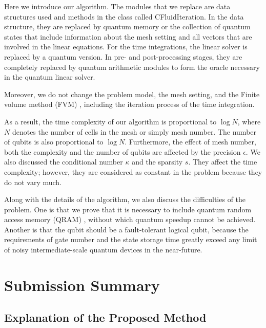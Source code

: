 \documentclass[%
 reprint,
 amsmath,amssymb,
pra,
]{revtex4-1}
\begin{document}
Here we introduce our algorithm. The modules that we replace are data structures used and methods in the class called CFluidIteration. In the data structure, they are replaced by quantum memory or the collection of quantum states that include information about the mesh setting and all vectors that are involved in the linear equations. For the time integrations, the linear solver is replaced by a quantum version. In pre- and post-processing stages, they are completely replaced by quantum arithmetic modules to form the oracle necessary in the quantum linear solver.

Moreover, we do not change the problem model, the mesh setting, and the Finite volume method (FVM) \cite{jameson1981numerical, eymard2000finite, ferziger2002computational, hirsch2007numerical, barth2018finite, herbin2019conservativity}, including the iteration process of the time integration.

As a result, the time complexity of our algorithm is proportional to $\log N$, where $N$ denotes the number of cells in the mesh or simply mesh number. The number of qubits is also proportional to $\log N$. Furthermore, the effect of mesh number, both the complexity and the number of qubits are affected by the precision $\epsilon$. We also discussed the conditional number $\kappa$ and the sparsity $s$. They affect the time complexity; however, they are considered as constant in the problem because they do not vary much.

Along with the details of the algorithm, we also discuss the difficulties of the problem. One is that we prove that it is necessary to include quantum random access memory (QRAM) \cite{giovannetti2008architectures, giovannetti2008quantum, moiseev2014multi, arunachalam2015robustness, naik2017random, park2019circuit,di2019fault,hann2019hardware}, without which quantum speedup cannot be achieved. Another is that the qubit should be a fault-tolerant logical qubit\cite{divincenzo1996fault, preskill1998fault, aharonov1999fault, steane1999efficient, bacon2000universal, raussendorf2007fault, benhelm2008towards, lund2008fault, chow2014implementing}, because the requirements of gate number and the state storage time greatly exceed any limit of noisy intermediate-scale quantum devices in the near-future.


\section{Submission Summary}

\subsection{Explanation of the Proposed Method}
\end{document}
